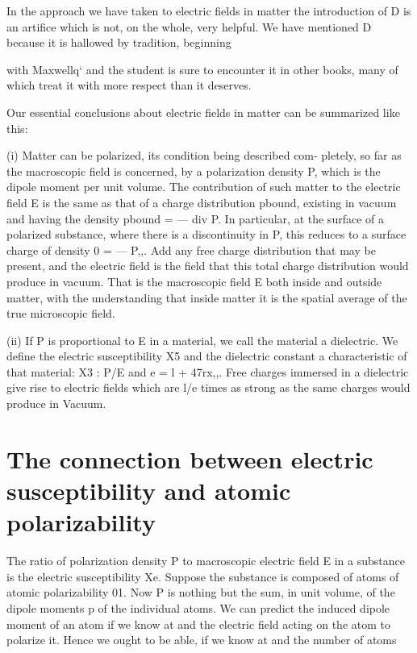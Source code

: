 {{In the approach we have taken to electric fields in matter the introduction
of D is an artifice which is not, on the whole, very helpful.
We have mentioned D because it is hallowed by tradition, beginning

with Maxwellq‘ and the student is sure to encounter it in other books,
many of which treat it with more respect than it deserves.

Our essential conclusions about electric fields in matter can be
summarized like this:

(i) Matter can be polarized, its condition being described com-
pletely, so far as the macroscopic field is concerned, by a
polarization density P, which is the dipole moment per unit
volume. The contribution of such matter to the electric
field E is the same as that of a charge distribution pbound,
existing in vacuum and having the density pbound =  --- div P.
In particular, at the surface of a polarized substance, where
there is a discontinuity in P, this reduces to a surface charge
of density 0 =  --- P,,. Add any free charge distribution that
may be present, and the electric field is the field that this
total charge distribution would produce in vacuum. That
is the macroscopic field E both inside and outside matter,
with the understanding that inside matter it is the spatial
average of the true microscopic field.

(ii) If P is proportional to E in a material, we call the material
a dielectric. We define the electric susceptibility X5 and the
dielectric constant a characteristic of that material:
X3 : P/E and e = l + 47rx,,. Free charges immersed in
a dielectric give rise to electric fields which are l/e times
as strong as the same charges would produce in Vacuum.

\section{The connection between electric susceptibility and atomic polarizability}

The ratio of polarization density P to macroscopic electric field E
in a substance is the electric susceptibility Xe. Suppose the substance
is composed of atoms of atomic polarizability 01. Now P is nothing
but the sum, in unit volume, of the dipole moments p of the individual
atoms. We can predict the induced dipole moment of an atom if
we know at and the electric field acting on the atom to polarize it.
Hence we ought to be able, if we know at and the number of atoms

}}
